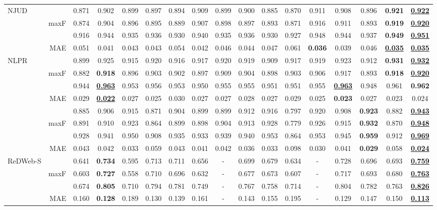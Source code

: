 \documentclass[10pt,twocolumn,letterpaper]{article}
\def\blu#1{\textbf{\color{blue} #1}} \def\red#1{\textbf{\color{red}\underline{#1}}}
\begin{document}
\begin{table*}[t]
\begin{tabular}{lr|cccccccccccccc|c}
  \multirow{4}{*}{NJUD}
    &    &0.871 &0.902 &0.899 &0.897 &0.894 &0.909 &0.899 &0.900 &0.885 &0.870 &0.911 &0.908 &0.896 &\blu{0.921} &\red{0.922}\\
    & maxF  &0.874 &0.904 &0.896 &0.895 &0.889 &0.907 &0.898 &0.897 &0.893 &0.871 &0.916 &0.911 &0.893 &\blu{0.919} &\red{0.920} \\
    &  &0.916 &0.944 &0.935 &0.936 &0.930 &0.940 &0.935 &0.936 &0.930 &0.927 &0.948 &0.944 &0.937 &\blu{0.949} &\red{0.951}\\
  \cite{ju2014njud}& MAE &0.051 &0.041 &0.043 &0.043 &0.054 &0.042 &0.046 &0.044 &0.047 &0.061 &\blu{0.036} &0.039 &0.046 &\red{0.035} &\red{0.035} \\
     \hline
  \multirow{4}{*}{NLPR}
    &    &0.899 &0.925 &0.915 &0.920 &0.916 &0.917 &0.920 &0.919 &0.909 &0.917 &0.919 &0.923 &0.912 &\blu{0.931} &\red{0.932}\\
    & maxF  &0.882 &\blu{0.918} &0.896 &0.903 &0.902 &0.897 &0.909 &0.904 &0.898 &0.903 &0.906 &0.917 &0.893 &\blu{0.918} &\red{0.920}\\
    &  &0.944 &\red{0.963} &0.953 &0.956 &0.953 &0.950 &0.955 &0.955 &0.951 &0.951 &0.955 &\red{0.963} &0.948 &0.961 &\blu{0.962}\\
   \cite{peng2014nlpr}& MAE &0.029 &\red{0.022} &0.027 &0.025 &0.030 &0.027 &0.027 &0.028 &0.027 &0.029 &0.025 &\blu{0.023} &0.027 &0.023 &0.024\\
     \hline
\multirow{4}{*}{}
&   &0.885 &0.906 &0.915 &0.871 &0.904 &0.899 &0.899 &0.912 &0.916 &0.797 &0.920 &0.908 &\blu{0.923} &0.882 &\red{0.943}\\
    DUTLF& maxF &0.891 &0.910 &0.923 &0.864 &0.899 &0.898 &0.904 &0.913 &0.928 &0.779 &0.926 &0.915 &\blu{0.932} &0.870 &\red{0.948}\\
    -Depth&   &0.928 &0.941 &0.950 &0.908 &0.935 &0.933 &0.939 &0.940 &0.953 &0.864 &0.953 &0.945 &\blu{0.959} &0.912 &\red{0.969}\\
     \cite{Piao2019dmra}& MAE &0.043 &0.042 &0.033 &0.059 &0.043 &0.041 &0.042 &0.036 &0.033 &0.098 &0.030 &0.041 &\blu{0.029} &0.058 &\red{0.024}\\
     \hline
\multirow{4}{*}{ReDWeb-S}
    &    &0.641 &\blu{0.734} &0.595 &0.713 &0.711 &0.656 &-	 &0.699 &0.679 &0.634 &- &0.728 &0.696 &0.693 &\red{0.759}\\
    & maxF   &0.603 &\blu{0.727} &0.558 &0.710 &0.696 &0.632 &- &0.677 &0.673 &0.607 &- &0.717 &0.693 &0.680 &\red{0.763}\\
    &   &0.674 &\blu{0.805} &0.710 &0.794 &0.781 &0.749 &- &0.767 &0.758 &0.714 &- &0.804 &0.782 &0.763 &\red{0.826}\\
    \cite{liu2020ReDWeb-S}& MAE  &0.160 &\blu{0.128} &0.189 &0.130 &0.139 &0.161 &- &0.143 &0.155 &0.195 &- &0.129 &0.147 &0.150 &\red{0.113}\\
     \hline


\end{tabular}
\end{table*}
\end{document}
